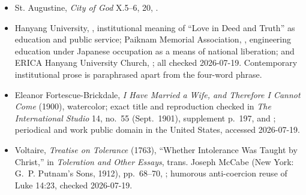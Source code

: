 {\begin{itemize}
\item St. Augustine, \emph{City of God} X.5--6, 20, .
\item Hanyang University, , institutional meaning of ``Love in Deed and Truth'' as education and public service; Paiknam Memorial Association, , engineering education under Japanese occupation as a means of national liberation; and ERICA Hanyang University Church, ; all checked 2026-07-19. Contemporary institutional prose is paraphrased apart from the four-word phrase.
\item Eleanor Fortescue-Brickdale, \emph{I Have Married a Wife, and Therefore I Cannot Come} (1900), watercolor; exact title and reproduction checked in \emph{The International Studio} 14, no.~55 (Sept.~1901), supplement p.~197,  and ; periodical and work public domain in the United States, accessed 2026-07-19.
\item Voltaire, \emph{Treatise on Tolerance} (1763), ``Whether Intolerance Was Taught by Christ,'' in \emph{Toleration and Other Essays}, trans. Joseph McCabe (New York: G.~P. Putnam's Sons, 1912), pp.~68--70, ; humorous anti-coercion reuse of Luke 14:23, checked 2026-07-19.
\end{itemize}
}

